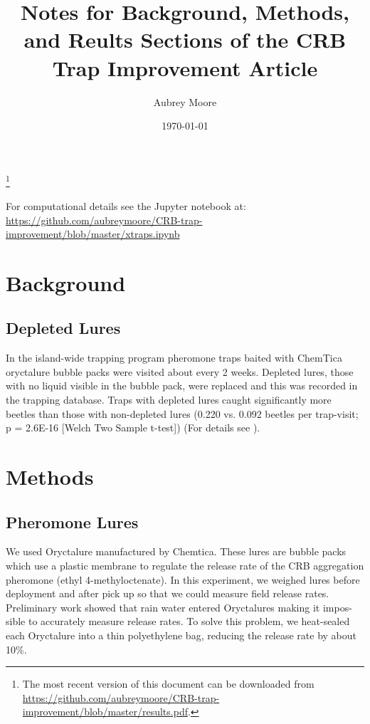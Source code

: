 \documentclass[12pt,letterpaper,english,bibliography=totocnumbered, abstract=on]{scrartcl}
\begin{document}

\title{Notes for Background, Methods, and Reults Sections of the CRB Trap Improvement Article}

\author{Aubrey Moore}

\date{\today}


\maketitle

\tableofcontents

\footnote{The most recent version of this document can be downloaded from\\
\url{https://github.com/aubreymoore/CRB-trap-improvement/blob/master/results.pdf}.}

\pagebreak

For computational details see the Jupyter notebook at:\\
\url{https://github.com/aubreymoore/CRB-trap-improvement/blob/master/xtraps.ipynb}

\section{Background}

\subsection{Depleted Lures}

In the island-wide trapping program pheromone traps baited with ChemTica oryctalure bubble packs were visited about every 2 weeks. Depleted lures, those with no liquid visible in the bubble pack,  were replaced and this was recorded in the trapping database. Traps with depleted lures caught significantly more beetles than those with non-depleted lures (0.220 vs. 0.092 beetles per trap-visit; p = 2.6E-16 [Welch Two Sample t-test]) (For details see \cite{moore_research_2012}).

\section{Methods}

\subsection{Pheromone Lures}

We used Oryctalure manufactured by Chemtica. These lures are bubble packs which use a plastic
membrane to regulate the release rate of the CRB aggregation pheromone (ethyl 4-methyloctenate).
In this experiment, we weighed lures before deployment and after pick up so that we could measure
field release rates. Preliminary work showed that rain water entered Oryctalures making it impos-
sible to accurately measure release rates. To solve this problem, we heat-sealed each Oryctalure
into a thin polyethylene bag, reducing the release rate by about 10\%. 
\end{document}
